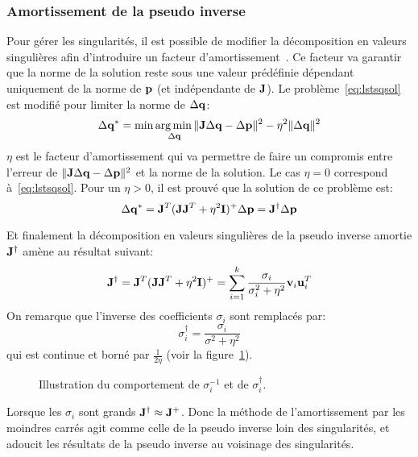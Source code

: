 \subsubsection{Amortissement de la pseudo inverse}
Pour gérer les singularités, il est possible de modifier la décomposition en valeurs singulières
afin d'introduire un facteur d'amortissement~\cite{nakamura86, wampler86}. Ce facteur 
va garantir que la norme de la solution reste sous une valeur prédéfinie dépendant uniquement
de la norme de ${\mathbf{p}}$ (et indépendante de ${\mathbf{J}}$).
Le problème~\eqref{eq:lstsqsol} est modifié pour limiter la norme de $\Delta {\mathbf{q}}$:
\begin{equation}
  \Delta \mbf{q}^* = \min \underset{\Delta \mbf{q}}\argmin \Vert \mbf{J} \Delta \mbf{q} - \Delta \mbf{p} \Vert^2 
  - \eta^2 \Vert \Delta \mbf{q} \Vert^2
  \label{eq:dampedlstsqsol}
\end{equation}
\noindent $\eta$ est le facteur d'amortissement qui va permettre de faire un compromis
entre l'erreur de $\Vert {\mathbf{J}} \Delta {\mathbf{q}} - \Delta {\mathbf{p}} \Vert^2$ et la norme
de la solution. Le cas $\eta = 0$ correspond à~\eqref{eq:lstsqsol}. Pour
un $\eta > 0$, il est prouvé que la solution de ce problème est:
\begin{equation*}
  \Delta {\mathbf{q}}^* = {\mathbf{J}}^T ( {\mathbf{J}} {\mathbf{J}}^T + \eta^2 {\mathbf{I}} )^{+} \Delta {\mathbf{p}} = {\mathbf{J}}^{\dagger} \Delta {\mathbf{p}}
\end{equation*}

Et finalement la décomposition en valeurs singulières de la pseudo inverse amortie ${\mathbf{J}}^{\dagger}$ amène au résultat suivant:
\begin{equation}
 {\mathbf{J}}^{\dagger} = {\mathbf{J}}^T ( {\mathbf{J}} {\mathbf{J}}^T + \eta^2 {\mathbf{I}} )^{+} = 
 \sum_{i = 1}^{k}{\frac{\sigma_i}{\sigma_i^2 + \eta^2} \mathbf{v}_i
	\mathbf{u}_i^T }
\end{equation}
On remarque que l'inverse des coefficients $\sigma_i$ sont remplacés par:
\begin{equation}
  \sigma_i^{\dagger} = \frac{\sigma_i}{\sigma^2 + \eta^2}
  \label{eq:dampingsvd}
\end{equation}
\noindent qui est continue et borné par $\frac{1}{2\eta}$ (voir la figure~\ref{fig:damp}). 
\begin{figure}[t]
  \begin{center}
    \resizebox{0.48\textwidth}{!}{
      
    }
  \end{center}
  \caption{Illustration du comportement de $\sigma_i^{-1}$ et de $\sigma_i^{\dagger}$.}
  \label{fig:damp}
\end{figure}
Lorsque les $\sigma_i$ sont grands ${\mathbf{J}}^{\dagger} \approx {\mathbf{J}}^{+}$. Donc la méthode de l'amortissement 
par les moindres carrés agit comme celle de la pseudo inverse loin des
singularités, et adoucit les résultats de la pseudo inverse au voisinage des singularités. 

